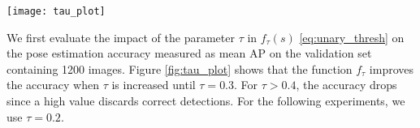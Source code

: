 \documentclass[runningheads]{llncs}
\begin{document}
\begin{figure*}[t!]
\centering
\captionsetup[figure]{skip=0pt}
\texttt{[image: tau\_plot]}
\caption{Impact of the parameter $\tau$ in (\ref{eq:unary_thresh}) on the pose estimation accuracy.}
\label{fig:tau_plot}
\end{figure*}

We first evaluate the impact of the parameter $\tau$ in $f_{\tau}(s)$ \eqref{eq:unary_thresh} on the pose estimation accuracy measured as mean AP on the validation set containing 1200 images. Figure \ref{fig:tau_plot} shows that the function $f_{\tau}$ improves the accuracy when $\tau$ is increased until $\tau = 0.3$. For $\tau > 0.4$, the accuracy drops since a high value discards correct detections. For the following experiments, we use $\tau = 0.2$.


\begin{table*}[t]
  \centering
  \footnotesize
  \setlength{\tabcolsep}{2.8pt} 
\def\arraystretch{1}

  \caption{Pose estimation results (AP) on the validation test set (1200 images) of the MPII Multi-Person Pose Dataset.}
\label{tab:final_acc_mpi_val}
\end{table*}
\end{document}
